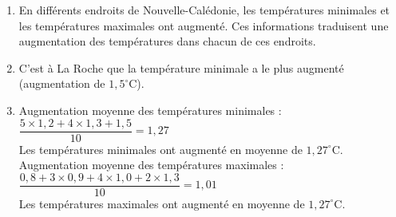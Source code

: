 
\begin{enumerate}
\item En différents endroits de Nouvelle-Calédonie, les températures minimales et les températures maximales ont augmenté. Ces informations traduisent une augmentation des températures dans chacun de ces endroits. 
\item C'est à La Roche que la température minimale a le plus augmenté  (augmentation de $1,5^{\circ}$C). 
\item Augmentation moyenne des températures minimales : \\[2mm]
$\dfrac{5\times1,2+4\times1,3+1,5}{10}=1,27$ \\[2mm]
Les températures minimales ont augmenté en moyenne de $1,27^{\circ}$C. \\
Augmentation moyenne des températures maximales : \\[2mm]
$\dfrac{0,8+3\times0,9+4\times1,0+2\times1,3}{10}=1,01$ \\[2mm]
Les températures maximales ont augmenté en moyenne de $1,27^{\circ}$C.
\end{enumerate}


